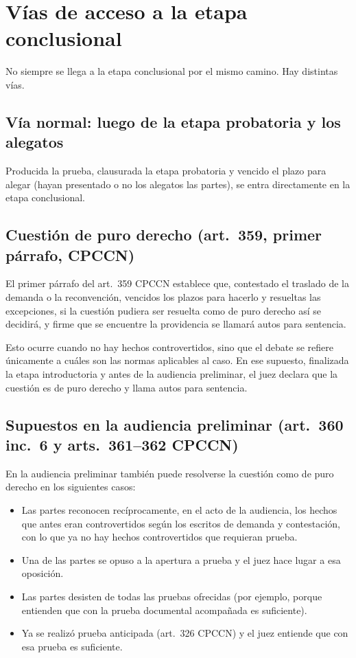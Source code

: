 \documentclass[12pt,oneside]{book}
\begin{document}
\section{Vías de acceso a la etapa conclusional}

No siempre se llega a la etapa conclusional por el mismo camino. Hay distintas vías.

\subsection{Vía normal: luego de la etapa probatoria y los alegatos}

Producida la prueba, clausurada la etapa probatoria y vencido el plazo para alegar (hayan presentado o no los alegatos las partes), se entra directamente en la etapa conclusional.

\subsection{Cuestión de puro derecho (art.~359, primer párrafo, CPCCN)}

El primer párrafo del art.~359 CPCCN establece que, contestado el traslado de la demanda o la reconvención, vencidos los plazos para hacerlo y resueltas las excepciones, si la cuestión pudiera ser resuelta como de puro derecho así se decidirá, y firme que se encuentre la providencia se llamará autos para sentencia.

Esto ocurre cuando no hay hechos controvertidos, sino que el debate se refiere únicamente a cuáles son las normas aplicables al caso. En ese supuesto, finalizada la etapa introductoria y antes de la audiencia preliminar, el juez declara que la cuestión es de puro derecho y llama autos para sentencia.

\subsection{Supuestos en la audiencia preliminar (art.~360 inc.~6 y arts.~361--362 CPCCN)}

En la audiencia preliminar también puede resolverse la cuestión como de puro derecho en los siguientes casos:

\begin{itemize}
    \item Las partes reconocen recíprocamente, en el acto de la audiencia, los hechos que antes eran controvertidos según los escritos de demanda y contestación, con lo que ya no hay hechos controvertidos que requieran prueba.
    \item Una de las partes se opuso a la apertura a prueba y el juez hace lugar a esa oposición.
    \item Las partes desisten de todas las pruebas ofrecidas (por ejemplo, porque entienden que con la prueba documental acompañada es suficiente).
    \item Ya se realizó prueba anticipada (art.~326 CPCCN) y el juez entiende que con esa prueba es suficiente.
\end{itemize}
\end{document}
